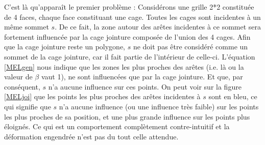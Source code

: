 C'est là qu'apparaît le premier problème : Considérons une grille 2*2
constituée de 4 faces, chaque face constituant une cage. Toutes les
cages sont incidentes à un même sommet $s$. De ce fait, la zone autour
des arêtes incidentes à ce sommet sera fortement influencée par la
cage jointure composée de l'union des 4 cages. Afin que la cage
jointure reste un polygone, $s$ ne doit pas être considéré comme un
sommet de la cage jointure, car il fait partie de l'intérieur de
celle-ci. L'équation \ref{MELgen} nous indique que les zones les plus
proches des arêtes (i.e. là ou la valeur de $\beta$ vaut 1), ne sont
influencées que par la cage jointure. Et que, par conséquent, $s$ n'a
aucune influence sur ces points. On peut voir sur la figure
\ref{MELjoi} que les points les plus proches des arêtes incidentes à
$s$ sont en bleu, ce qui signifie que $s$ n'a aucune influence (ou une
influence très faible) sur les points les plus proches de sa position,
et une plus grande influence sur les points plus éloignés. Ce qui est
un comportement complètement contre-intuitif et la déformation
engendrée n'est pas du tout celle attendue.

